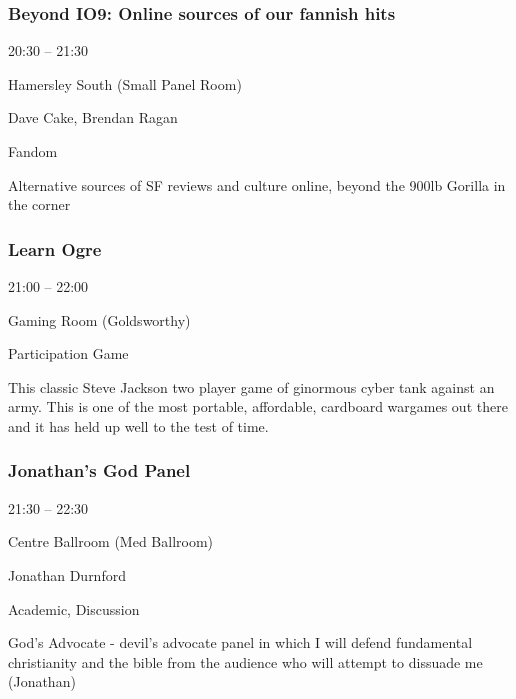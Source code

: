 \documentclass{scrreprt}
\begin{document}
\begin{multicols}{2}
\subsubsection*{Beyond IO9: Online sources of our fannish hits}\begin{description}
\setlength{\itemsep}{0pt}
\setlength{\parsep}{0pt}
\setlength{\parskip}{0pt}
\item[Time:]{20:30 -- 21:30}
\item[Venue:]{Hamersley South (Small Panel Room)}
\item[People:]{Dave Cake, Brendan Ragan}
\item[Tags:]{Fandom}\end{description}
Alternative sources of SF reviews and culture online, beyond the 900lb Gorilla in the corner
\subsubsection*{Learn Ogre}\begin{description}
\setlength{\itemsep}{0pt}
\setlength{\parsep}{0pt}
\setlength{\parskip}{0pt}
\item[Time:]{21:00 -- 22:00}
\item[Venue:]{Gaming Room (Goldsworthy)}
\item[Tags:]{Participation Game}\end{description}
This classic Steve Jackson two player game of ginormous cyber tank against an army. This is one of the most portable, affordable, cardboard wargames out there and it has held up well to the test of time.
\subsubsection*{Jonathan's God Panel}\begin{description}
\setlength{\itemsep}{0pt}
\setlength{\parsep}{0pt}
\setlength{\parskip}{0pt}
\item[Time:]{21:30 -- 22:30}
\item[Venue:]{Centre Ballroom (Med Ballroom)}
\item[People:]{Jonathan Durnford}
\item[Tags:]{Academic, Discussion}\end{description}
God’s Advocate - devil’s advocate panel in which I will defend fundamental christianity and the bible from the audience who will attempt to dissuade me (Jonathan)

\end{multicols}
\end{document}

